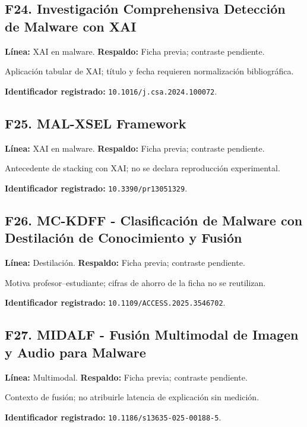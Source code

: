 \begin{samepage}
\subsection*{F24. Investigación Comprehensiva Detección de Malware con XAI}
\noindent\textbf{Línea:} XAI en malware. \textbf{Respaldo:} Ficha previa; contraste pendiente. 

Aplicación tabular de XAI; título y fecha requieren normalización bibliográfica.

\noindent\textbf{Identificador registrado:} \nolinkurl{10.1016/j.csa.2024.100072}.

\end{samepage}
\begin{samepage}
\subsection*{F25. MAL-XSEL Framework}
\noindent\textbf{Línea:} XAI en malware. \textbf{Respaldo:} Ficha previa; contraste pendiente. 

Antecedente de stacking con XAI; no se declara reproducción experimental.

\noindent\textbf{Identificador registrado:} \nolinkurl{10.3390/pr13051329}.

\end{samepage}
\begin{samepage}
\subsection*{F26. MC-KDFF - Clasificación de Malware con Destilación de Conocimiento y Fusión}
\noindent\textbf{Línea:} Destilación. \textbf{Respaldo:} Ficha previa; contraste pendiente. 

Motiva profesor--estudiante; cifras de ahorro de la ficha no se reutilizan.

\noindent\textbf{Identificador registrado:} \nolinkurl{10.1109/ACCESS.2025.3546702}.

\end{samepage}
\begin{samepage}
\subsection*{F27. MIDALF - Fusión Multimodal de Imagen y Audio para Malware}
\noindent\textbf{Línea:} Multimodal. \textbf{Respaldo:} Ficha previa; contraste pendiente. 

Contexto de fusión; no atribuirle latencia de explicación sin medición.

\noindent\textbf{Identificador registrado:} \nolinkurl{10.1186/s13635-025-00188-5}.

\end{samepage}
